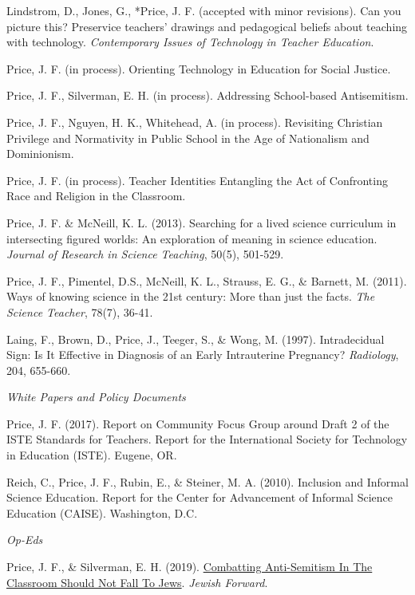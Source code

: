 \documentclass[11pt,article,oneside]{memoir}
\begin{document}
\ind Lindstrom, D., Jones, G., *Price, J. F. (accepted with minor revisions). Can you picture this? Preservice teachers’ drawings and pedagogical beliefs about teaching with technology. \textit{Contemporary Issues of Technology in Teacher Education}.

\ind Price, J. F. (in process). Orienting Technology in Education for Social Justice.

\ind Price, J. F., Silverman, E. H. (in process). Addressing School-based Antisemitism.

\ind Price, J. F., Nguyen, H. K., Whitehead, A. (in process). Revisiting Christian Privilege and Normativity in Public School in the Age of Nationalism and Dominionism.

\ind Price, J. F. (in process). Teacher Identities Entangling the Act of Confronting Race and Religion in the Classroom.

\ind Price, J. F. \& McNeill, K. L. (2013). Searching for a lived science curriculum in intersecting figured worlds: An exploration of meaning in science education. \textit{Journal of Research in Science Teaching}, 50(5), 501-529.

\ind Price, J. F., Pimentel, D.S., McNeill, K. L., Strauss, E. G., \& Barnett, M. (2011). Ways of knowing science in the 21st century: More than just the facts. \textit{The Science Teacher}, 78(7), 36-41.

\ind Laing, F., Brown, D., Price, J., Teeger, S., \& Wong, M. (1997). Intradecidual Sign: Is It Effective in Diagnosis of an Early Intrauterine Pregnancy? \textit{Radiology}, 204, 655-660.

\bigskip
\noindent\emph{White Papers and Policy Documents \vspace{0.05in}}

\ind Price, J. F. (2017). Report on Community Focus Group around Draft 2 of the ISTE Standards for Teachers. Report for the International Society for Technology in Education (ISTE). Eugene, OR.

\ind Reich, C., Price, J. F., Rubin, E., \& Steiner, M. A. (2010). Inclusion and Informal Science Education. Report for the Center for Advancement of Informal Science Education (CAISE). Washington, D.C.

\bigskip
\noindent\emph{Op-Eds \vspace{0.05in}}

\ind Price, J. F., \& Silverman, E. H. (2019). \href{https://forward.com/opinion/426018/combatting-anti-semitism-in-the-classroom-should-not-fall-to-jews/}{Combatting Anti-Semitism In The Classroom Should Not Fall To Jews}. \textit{Jewish Forward}.
\end{document}
